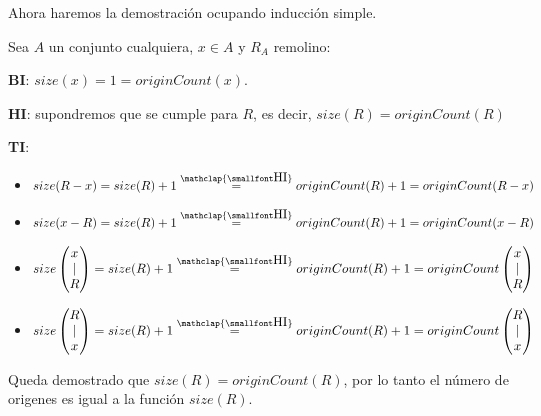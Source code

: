 \documentclass[12pt]{article}
\newcommand\myeq{\stackrel{\mathclap{\smallfont\mbox{HI}}}{=}}
\begin{document}
Ahora haremos la demostración ocupando inducción simple.

Sea $A$ un conjunto cualquiera, $x \in A$ y $R_A$ remolino:

\textbf{BI}: $size(x) = 1 = originCount(x)$.

\textbf{HI}: supondremos que se cumple para $R$, es decir, $size(R) = originCount(R)$

\textbf{TI}:
    \begin{itemize}
        \item $size(R - x) = size(R) + 1 \myeq originCount(R) + 1 = originCount(R - x)$
        \item $size(x - R) = size(R) + 1 \myeq originCount(R) + 1 = originCount(x - R)$
        \item 
           $size\left(\begin{matrix}
           x\\
           |\\
           R
         \end{matrix}\right) = size(R) + 1 \myeq originCount(R) + 1 = originCount\left(\begin{matrix}
           x\\
           |\\
           R
         \end{matrix}\right)$
         
         \item 
           $size\left(\begin{matrix}
           R\\
           |\\
           x
         \end{matrix}\right) = size(R) + 1 \myeq originCount(R) + 1 = originCount\left(\begin{matrix}
           R\\
           |\\
           x
         \end{matrix}\right)$
    \end{itemize}
    
    Queda demostrado que $size(R) = originCount(R)$, por lo tanto el número de origenes es igual a la función $size(R)$.

\end{document}
